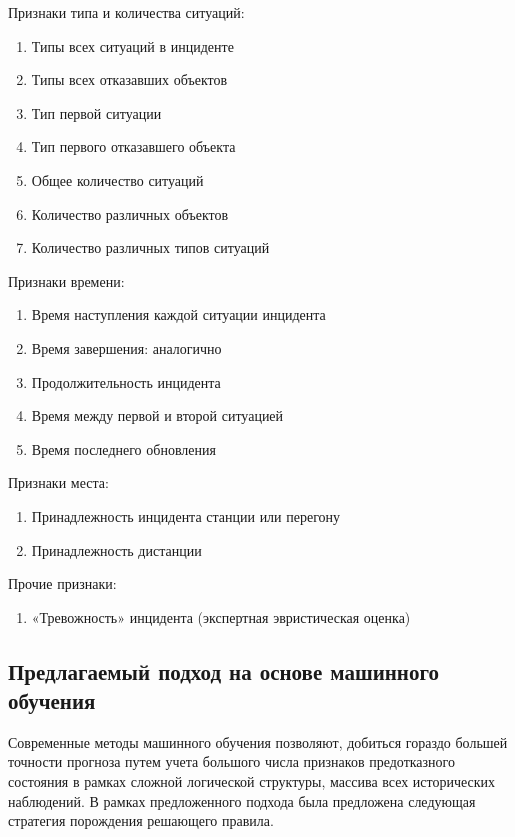 Признаки типа и количества ситуаций:
\begin{enumerate}
\item Типы всех ситуаций в инциденте
\item Типы всех отказавших объектов
\item Тип первой ситуации 
\item Тип первого отказавшего объекта
\item Общее количество ситуаций
\item Количество различных объектов
\item Количество различных типов ситуаций
\end{enumerate}

Признаки времени:
\begin{enumerate}
\item Время наступления каждой ситуации инцидента
\item Время завершения: аналогично
\item Продолжительность инцидента
\item Время между первой и второй ситуацией
\item Время последнего обновления
\end{enumerate}

Признаки места:

\begin{enumerate}
\item Принадлежность инцидента станции или перегону
\item Принадлежность дистанции
\end{enumerate}
Прочие признаки:

\begin{enumerate}
\item «Тревожность» инцидента (экспертная эвристическая оценка)
\end{enumerate}


\subsection{Предлагаемый подход на основе машинного обучения}
Современные методы машинного обучения позволяют, добиться гораздо большей точности прогноза путем учета большого числа признаков предотказного состояния в рамках сложной логической структуры, массива всех исторических наблюдений. В рамках предложенного подхода была предложена следующая стратегия порождения решающего правила.

